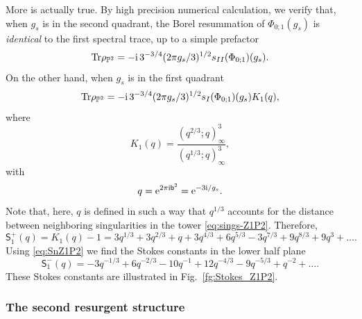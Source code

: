 \documentclass[a4paper,11pt]{article}
\theoremstyle{definition}
\def\IP{{\mathbb P}}
\newcommand{\tr}{{\rm Tr}}
\newcommand{\re}{{\rm e}}
\newcommand{\ri}{{\rm i}}
\newcommand{\bb}{\mathsf{b}}
\def\ms{\mathsf}
\begin{document}
More is actually true.  By high precision numerical calculation, we
verify that, when $g_s$ is in the second quadrant, the Borel resummation
of $\Phi_{0;1}(g_s)$ is \emph{identical} to the first spectral trace, up to a
simple prefactor
%
\begin{equation}
  \tr\rho_{\IP^2} = -\ri\, 3^{-3/4}(2\pi g_s/3)^{1/2} s_{II}(\Phi_{0;1})(g_s).
\end{equation}
%
On the other hand, when $g_s$ is in the first quadrant
%
\begin{equation}
  \tr\rho_{\IP^2} = -\ri\, 3^{-3/4}(2\pi g_s/3)^{1/2}
  s_{I}(\Phi_{0;1})(g_s) K_1(q),
\end{equation}
%
where
%
\begin{equation}
  K_1(q) = \frac{(q^{2/3};q)_\infty^3}{(q^{1/3};q)_\infty^3},
\end{equation}
with
\begin{equation}
  q= \re^{2\pi\ri\bb^2} = \re^{-3\ri/g_s}.
\end{equation}
%
Note that, here, $q$ is defined in such a way that $q^{1/3}$ accounts
for the distance between neighboring singularities in the tower
\eqref{eq:sings-Z1P2}. Therefore,
%
\begin{equation}
  \ms{S}_1^{+}(q) = K_1(q) - 1 = 3q^{1/3} + 3q^{2/3} + q +
  3q^{4/3}+6q^{5/3} - 3q^{7/3}+9 q^{8/3}+9q^3+ \ldots.
\end{equation}
%
Using \eqref{eq:SnZ1P2} we find the Stokes constants in the lower half
plane
%
\begin{equation}
  \ms{S} _1^-(q) = -3 q^{-1/3} + 6 q^{-2/3} - 10 q^{-1} + 12 q^{-4/3}
  - 9q^{-5/3} + q^{-2} + \ldots.
\end{equation}
%
These Stokes constants are illustrated in Fig.~\ref{fg:Stokes_Z1P2}.



\subsubsection{The second resurgent structure}
\end{document}
